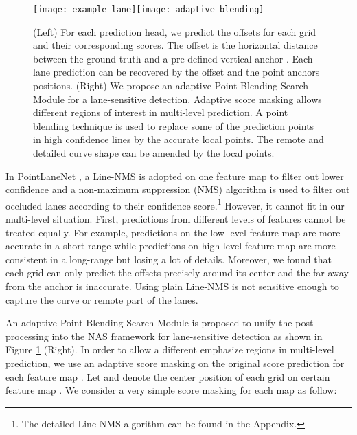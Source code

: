 \documentclass[runningheads]{llncs}
\begin{document}
\begin{figure}[tb]


\begin{centering}
\texttt{[image: example\_lane]}\texttt{[image: adaptive\_blending]}
\par\end{centering}


\caption{\label{fig:The-anchor-proposal-based}(Left) For each prediction head,
we predict the offsets  for each grid 
and their corresponding scores. The offset  is
the horizontal distance between the ground truth and a pre-defined
vertical anchor . Each lane prediction can be recovered
by the offset and the point anchors positions. (Right) We propose
an adaptive Point Blending Search Module for a lane-sensitive detection.
Adaptive score masking allows different regions of interest in multi-level
prediction. A point blending technique is used to replace some
of the prediction points in high confidence lines by the accurate
local points. The remote and detailed curve shape can be amended by
the local points.}

\end{figure}

In PointLaneNet \cite{chen2019pointlanenet}, a Line-NMS is adopted
on one feature map to filter out lower confidence and a non-maximum
suppression (NMS) algorithm is used to filter out occluded lanes according
to their confidence score.\footnote{The detailed Line-NMS algorithm can be found in the Appendix.}
However, it cannot fit in our multi-level situation. First, predictions
from different levels of features cannot be treated equally. For example,
predictions on the low-level feature map are more accurate in a short-range
while predictions on high-level feature map are more consistent in
a long-range but losing a lot of details. Moreover, we found that
each grid can only predict the offsets precisely around its center
and the  far away from the anchor is inaccurate.
Using plain Line-NMS is not sensitive enough to capture the curve
or remote part of the lanes.

An adaptive Point Blending Search Module is proposed to unify the
post-processing into the NAS framework for lane-sensitive detection
as shown in Figure \ref{fig:The-anchor-proposal-based} (Right). In
order to allow a different emphasize regions in multi-level prediction,
we use an adaptive score masking  on the original score prediction
for each feature map . Let  and  denote the center
position of each grid  on certain feature map . We consider
a very simple score masking for each map as follow:
\end{document}
